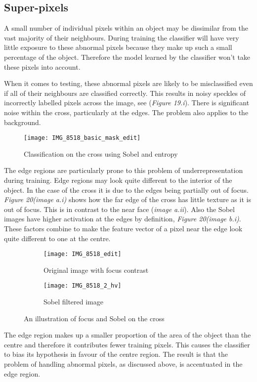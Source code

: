 \documentclass[12pt]{IIBproject}
\begin{document}
\subsection{Super-pixels}
A small number of individual pixels within an object may be dissimilar from the vast majority of their neighbours. During training the classifier will have very little exposure to these abnormal pixels because they make up such a small percentage of the object. Therefore the model learned by the classifier won't take these pixels into account. 

When it comes to testing, these abnormal pixels are likely to be misclassified even if all of their neighbours are classified correctly. This results in noisy speckles of incorrectly labelled pixels across the image, see (\emph{Figure 19.i}). There is significant noise within the cross, particularly at the edges. The problem also applies to the background.
\begin{figure}[H]
  
  \centering
    \texttt{[image: IMG\_8518\_basic\_mask\_edit]}
    \caption{Classification on the cross using Sobel and entropy}
\end{figure}
The edge regions are particularly prone to this problem of underrepresentation during training. Edge regions may look quite different to the interior of the object. In the case of the cross it is due to the edges being partially out of focus. \emph{Figure 20(image a.i)} shows how the far edge of the cross has little texture as it is out of focus. This is in contrast to the near face (\emph{image a.ii}). Also the Sobel images have higher activation at the edges by definition, \emph{Figure 20(image b.i)}. These factors combine to make the feature vector of a pixel near the edge look quite different to one at the centre.
\begin{figure}[H]
\centering
\begin{subfigure}{.45\textwidth}
  \centering
  \texttt{[image: IMG\_8518\_edit]}
  \caption{Original image with focus contrast}
  \label{fig:sub2}
\end{subfigure}
\begin{subfigure}{.45\textwidth}
  \centering
  \texttt{[image: IMG\_8518\_2\_hv]}
  \caption{Sobel filtered image}
  \label{fig:sub1}
\end{subfigure}%

\caption{An illustration of focus and Sobel on the cross}
\label{fig:test}
\end{figure}
 The edge region makes up a smaller proportion of the area of the object than the centre and therefore it contributes fewer training pixels. This causes the classifier to bias its hypothesis in favour of the centre region. The result is that the problem of handling abnormal pixels, as discussed above, is accentuated in the edge region. 
 
\end{document}
